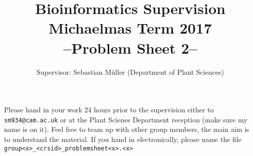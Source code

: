 \documentclass[11pt,runningheads,a4paper]{article}
\begin{document}
\title{{\LARGE Bioinformatics Supervision}\\
{\Large Michaelmas Term 2017}\\
{\Large --Problem Sheet 2--}}

\author{Supervisor: Sebastian Müller (Department of Plant Sciences)}
\date{}

\maketitle

Please hand in your work 24 hours prior to the supervision either to \texttt{sm934@cam.ac.uk} or at the Plant Scienes Department reception (make sure my name is on it).
Feel free to team up with other group members, the main aim is to understand the material.
If you hand in electronically, please name the file \texttt{group<x>\_<crsid>\_problemsheet<x>.<x>}
\end{document}
